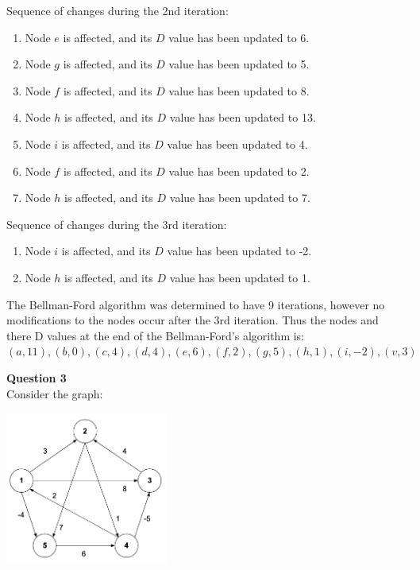 \documentclass{article}
\begin{document}
Sequence of changes during the 2nd iteration:
\begin{enumerate}
    \item Node $e$ is affected, and its $D$ value has been updated to 6.
    \item Node $g$ is affected, and its $D$ value has been updated to 5.
    \item Node $f$ is affected, and its $D$ value has been updated to 8.
    \item Node $h$ is affected, and its $D$ value has been updated to 13.
    \item Node $i$ is affected, and its $D$ value has been updated to 4.
    \item Node $f$ is affected, and its $D$ value has been updated to 2.
    \item Node $h$ is affected, and its $D$ value has been updated to 7.
\end{enumerate}

Sequence of changes during the 3rd iteration:
\begin{enumerate}
    \item Node $i$ is affected, and its $D$ value has been updated to -2.
    \item Node $h$ is affected, and its $D$ value has been updated to 1.
\end{enumerate}

The Bellman-Ford algorithm was determined to have 9 iterations, however no modifications to the nodes occur after the 3rd iteration. Thus the nodes and there D values at the end of the Bellman-Ford's algorithm is:\\

$(a, 11), (b, 0), (c, 4), (d, 4), (e, 6), (f, 2), (g, 5), (h, 1), (i, -2), (v, 3)$

\bigskip
{\bf Question 3}\\
Consider the graph:
\begin{center}
    \includegraphics[width=0.4\textwidth]{3.png}
\end{center}
\end{document}
